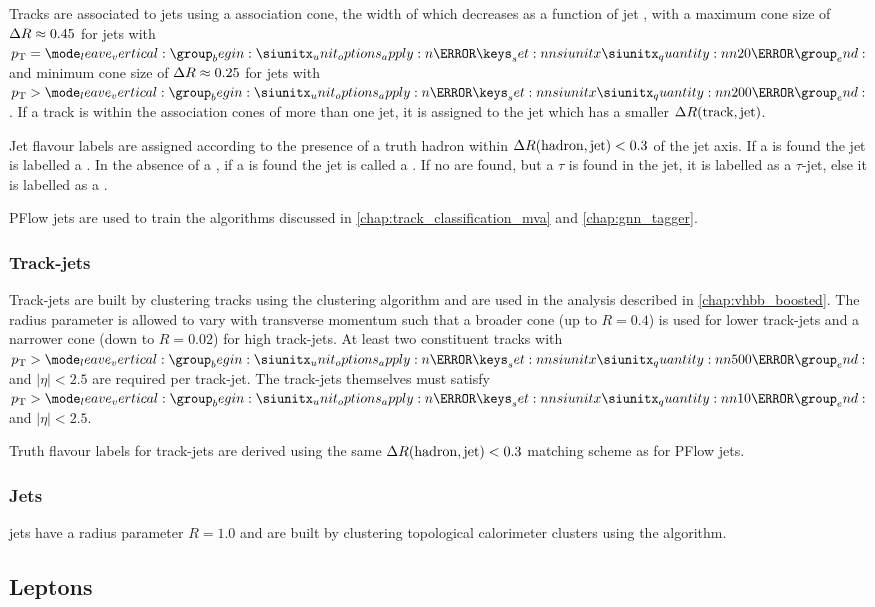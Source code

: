 Tracks are associated to jets using a \DeltaR association cone, the width of which decreases as a function of jet \pt, with a maximum cone size of $\Delta R \approx 0.45$ for jets with $\pt = \SI{20}{\GeV}$ and minimum cone size of $\Delta R \approx 0.25$ for jets with $\pt > \SI{200}{\GeV}$. 
If a track is within the association cones of more than one jet, it is assigned to the jet which has a smaller $\Delta R(\text{track}, \text{jet})$.

Jet flavour labels are assigned according to the presence of a truth hadron within ${\Delta R(\text{hadron},\text{jet})<0.3}$ of the jet axis. If a \bhadron is found the jet is labelled a \bjet. In the absence of a \bhadron, if a \chadron is found the jet is called a \cjet.
If no \borchadrons are found, but a $\tau$ is found in the jet, it is labelled as a $\tau$-jet, else it is labelled as a \ljet.

PFlow jets are used to train the algorithms discussed in \cref{chap:track_classification_mva} and \cref{chap:gnn_tagger}.

\subsubsection{Track-jets}
Track-jets are built by clustering tracks using the \antikt clustering algorithm and are used in the analysis described in \cref{chap:vhbb_boosted}.
The radius parameter is allowed to vary with transverse momentum such that a broader cone (up to $R=0.4$) is used for lower \pt track-jets and a narrower cone (down to $R=0.02$) for high \pt track-jets.
At least two constituent tracks with $\pt > \SI{500}{\MeV}$ and $|\eta| < 2.5$ are required per track-jet.
The track-jets themselves must satisfy $\pt > \SI{10}{\GeV}$ and $|\eta| < 2.5$.

Truth flavour labels for track-jets are derived using the same ${\Delta R(\text{hadron},\text{jet})<0.3}$ matching scheme as for PFlow jets.

\subsubsection{\LargeR Jets}
\LargeR jets have a radius parameter $R=1.0$ and are built by clustering topological calorimeter clusters using the \antikt algorithm.



\subsection{Leptons}\label{sec:lepton_reco}

